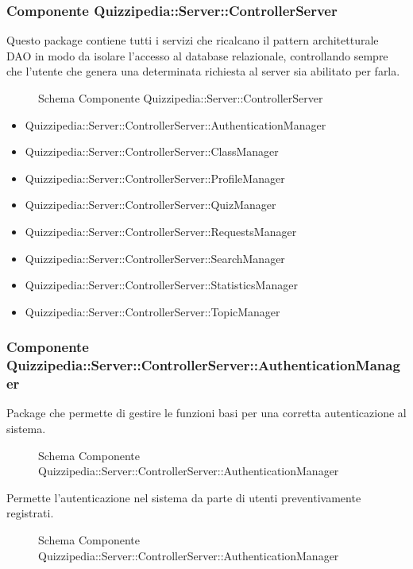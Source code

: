 \subsubsection{Componente Quizzipedia::Server::ControllerServer}
Questo package contiene tutti i servizi che ricalcano il pattern architetturale DAO in modo da isolare l'accesso al database relazionale, controllando sempre che l'utente che genera una determinata richiesta al server sia abilitato per farla.
\begin{figure}[H]
\centering
\noindent{}
\caption{Schema Componente Quizzipedia::Server::ControllerServer}
\end{figure}
\begin{itemize}
\item Quizzipedia::Server::ControllerServer::AuthenticationManager
\item Quizzipedia::Server::ControllerServer::ClassManager
\item Quizzipedia::Server::ControllerServer::ProfileManager
\item Quizzipedia::Server::ControllerServer::QuizManager
\item Quizzipedia::Server::ControllerServer::RequestsManager
\item Quizzipedia::Server::ControllerServer::SearchManager
\item Quizzipedia::Server::ControllerServer::StatisticsManager
\item Quizzipedia::Server::ControllerServer::TopicManager
\end{itemize}
\subsubsection{Componente Quizzipedia::Server::ControllerServer::AuthenticationManager}
Package che permette di gestire le funzioni basi per una corretta autenticazione al sistema.
\begin{figure}[H]
\centering
\noindent{}
\caption{Schema Componente Quizzipedia::Server::ControllerServer::AuthenticationManager}
\end{figure}
Permette l'autenticazione nel sistema da parte di utenti preventivamente registrati.
\begin{figure}[H]
\centering
\noindent{}
\caption{Schema Componente Quizzipedia::Server::ControllerServer::AuthenticationManager}
\end{figure}
